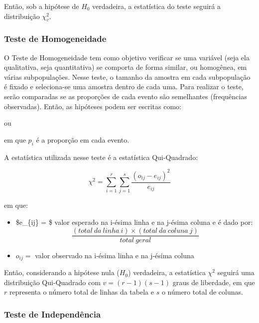 \documentclass[
]{estat/estat}
\begin{document}
Então, sob a hipótese de \(H_{0}\) verdadeira, a estatística do teste
seguirá a distribuição \(\chi_{v}^{2}\).

\subsubsection{Teste de Homogeneidade}\label{teste-de-homogeneidade}

O Teste de Homogeneidade tem como objetivo verificar se uma variável
(seja ela qualitativa, seja quantitativa) se comporta de forma similar,
ou homogênea, em várias subpopulações. Nesse teste, o tamanho da amostra
em cada subpopulação é fixado e seleciona-se uma amostra dentro de cada
uma. Para realizar o teste, serão comparadas se as proporções de cada
evento são semelhantes (frequências observadas). Então, as hipóteses
podem ser escritas como:


ou


em que \(p_{i}\) é a proporção em cada evento.

A estatística utilizada nesse teste é a estatística Qui-Quadrado:

\[ \chi^{2} = \displaystyle\sum_{i=1}^r \sum_{j=1}^s \frac{ {(o_{ij} - e_{ij})}^2}{e_{ij}} \]

em que:

\begin{itemize}
\item
  \$e\_\{ij\} = \$ valor esperado na i-ésima linha e na j-ésima coluna e
  é dado por:
  \[ \frac{(total\ da\ linha\ i) \times (total\ da\ coluna\ j)}{total\ geral} \]
\item
  \(o_{ij} =\) valor observado na i-ésima linha e na j-ésima coluna
\end{itemize}

Então, considerando a hipótese nula (\(H_{0}\)) verdadeira, a
estatística \(\chi^{2}\) seguirá uma distribuição Qui-Quadrado com
\(v = (r - 1)(s - 1)\) graus de liberdade, em que \(r\) representa o
número total de linhas da tabela e \(s\) o número total de colunas.

\subsubsection{Teste de Independência}\label{teste-de-independuxeancia}
\end{document}
